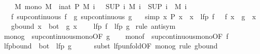 \begin{isabellebody}
\ \ \ {\isasymalpha}{\isacharcolon}\ {\isachardoublequoteopen}{\isasymAnd}M{\isachardot}\ mono\ M\ {\isasymLongrightarrow}\ {\isacharparenleft}{\isasymAnd}i{\isacharcolon}{\isacharcolon}nat{\isachardot}\ P\ {\isacharparenleft}M\ i{\isacharparenright}{\isacharparenright}\ {\isasymLongrightarrow}\ {\isasymalpha}\ {\isacharparenleft}SUP\ i{\isachardot}\ M\ i{\isacharparenright}\ {\isacharequal}\ {\isacharparenleft}SUP\ i{\isachardot}\ {\isasymalpha}\ {\isacharparenleft}M\ i{\isacharparenright}{\isacharparenright}{\isachardoublequoteclose}\isanewline
\ \ \ f{\isacharcolon}\ {\isachardoublequoteopen}sup{\isacharunderscore}continuous\ f{\isachardoublequoteclose}\ \ g{\isacharcolon}\ {\isachardoublequoteopen}sup{\isacharunderscore}continuous\ g{\isachardoublequoteclose}\isanewline
\ \ \ {\isacharbrackleft}simp{\isacharbrackright}{\isacharcolon}\ {\isachardoublequoteopen}{\isasymAnd}x{\isachardot}\ P\ x\ {\isasymLongrightarrow}\ x\ {\isasymle}\ lfp\ f\ {\isasymLongrightarrow}\ {\isasymalpha}\ {\isacharparenleft}f\ x{\isacharparenright}\ {\isacharequal}\ g\ {\isacharparenleft}{\isasymalpha}\ x{\isacharparenright}{\isachardoublequoteclose}\isanewline
\ \ \ g{\isacharunderscore}bound{\isacharcolon}\ {\isachardoublequoteopen}{\isasymAnd}x{\isachardot}\ {\isasymalpha}\ bot\ {\isasymle}\ g\ x{\isachardoublequoteclose}\isanewline
\ \ \ {\isachardoublequoteopen}{\isasymalpha}\ {\isacharparenleft}lfp\ f{\isacharparenright}\ {\isacharequal}\ lfp\ g{\isachardoublequoteclose}\isanewline
%
\isadelimproof
%
\endisadelimproof
%
\isatagproof
{}\isamarkupfalse%
\ {\isacharparenleft}rule\ antisym{\isacharparenright}\isanewline
\ \ \isamarkupfalse%
\ mono{\isacharunderscore}g\ {\isacharequal}\ sup{\isacharunderscore}continuous{\isacharunderscore}mono{\isacharbrackleft}OF\ g{\isacharbrackright}\isanewline
\ \ \isamarkupfalse%
\ mono{\isacharunderscore}f\ {\isacharequal}\ sup{\isacharunderscore}continuous{\isacharunderscore}mono{\isacharbrackleft}OF\ f{\isacharbrackright}\isanewline
\ \ \isamarkupfalse%
\ lfp{\isacharunderscore}bound{\isacharcolon}\ {\isachardoublequoteopen}{\isasymalpha}\ bot\ {\isasymle}\ lfp\ g{\isachardoublequoteclose}\isanewline
\ \ \ \ \isamarkupfalse%
\ {\isacharparenleft}subst\ lfp{\isacharunderscore}unfold{\isacharbrackleft}OF\ mono{\isacharunderscore}g{\isacharbrackright}{\isacharparenright}\ {\isacharparenleft}rule\ g{\isacharunderscore}bound{\isacharparenright}\isanewline

\end{isabellebody}

